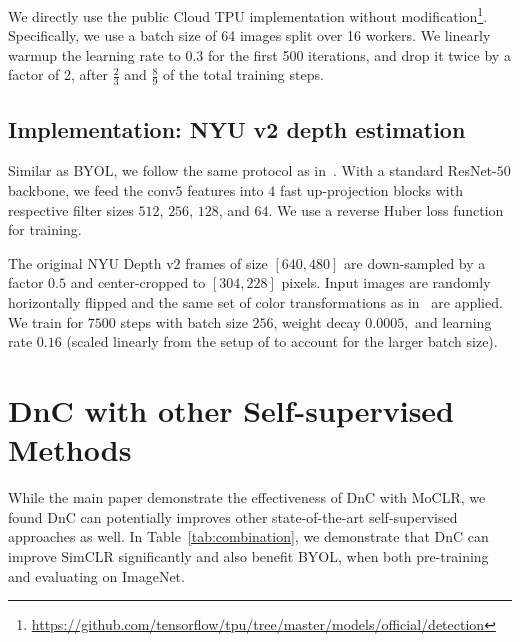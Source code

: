 \documentclass[final]{cvpr}
\newcommand\baseline{MoCLR}
\begin{document}
We directly use the public Cloud TPU implementation without modification\footnote{\small{\url{https://github.com/tensorflow/tpu/tree/master/models/official/detection}}}. Specifically, we use a batch size of 64 images split over 16 workers. We linearly warmup the learning rate to 0.3 for the first 500 iterations, and drop it twice by a factor of 2, after $\frac{2}{3}$ and $\frac{8}{9}$ of the total training steps.

\subsection{Implementation: NYU v2 depth estimation}

Similar as BYOL, we follow the same protocol as in~\cite{laina2016depth}. With a standard ResNet-$50$ backbone, we feed the conv$5$ features into $4$ fast up-projection blocks with respective filter sizes $512$, $256$, $128$, and $64$. We use a reverse Huber loss function for training.

The original NYU Depth v$2$ frames of size $\left[640, 480\right]$ are down-sampled by a factor $0.5$ and center-cropped to $\left[304, 228\right]$ pixels. Input images are randomly horizontally flipped and the same set of color transformations as in~\cite{grill2020bootstrap} are applied. We train for $7500$ steps with batch size $256$, weight decay $0.0005,$ and learning rate $0.16$ (scaled linearly from the setup of \cite{laina2016depth} to account for the larger batch size).


\section{DnC with other Self-supervised Methods}
While the main paper demonstrate the effectiveness of DnC with \baseline{}, we found DnC can potentially improves other state-of-the-art self-supervised approaches as well. In Table~\ref{tab:combination}, we demonstrate that DnC can improve SimCLR significantly and also benefit BYOL, when both pre-training and evaluating on ImageNet.
\end{document}
